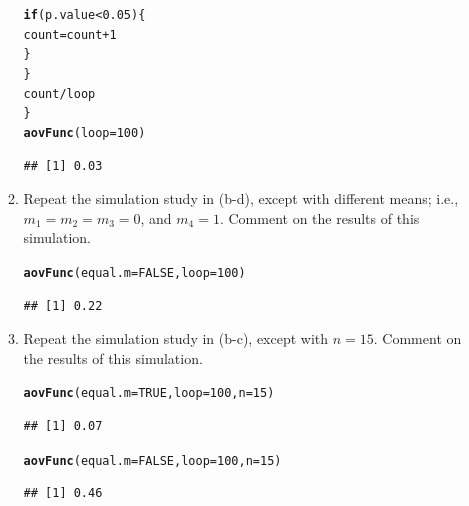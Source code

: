 \documentclass{article}\usepackage[]{graphicx}\usepackage[]{color}
\makeatletter
\newcommand{\hlnum}[1]{\textcolor[rgb]{0.686,0.059,0.569}{#1}}%
\newcommand{\hlopt}[1]{\textcolor[rgb]{0,0,0}{#1}}%
\newcommand{\hlstd}[1]{\textcolor[rgb]{0.345,0.345,0.345}{#1}}%
\newcommand{\hlkwa}[1]{\textcolor[rgb]{0.161,0.373,0.58}{\textbf{#1}}}%
\newcommand{\hlkwb}[1]{\textcolor[rgb]{0.69,0.353,0.396}{#1}}%
\newcommand{\hlkwc}[1]{\textcolor[rgb]{0.333,0.667,0.333}{#1}}%
\newcommand{\hlkwd}[1]{\textcolor[rgb]{0.737,0.353,0.396}{\textbf{#1}}}%
\newenvironment{kframe}{%
 \def\at@end@of@kframe{}%
 \ifinner\ifhmode%
  \def\at@end@of@kframe{\end{minipage}}%
  \begin{minipage}{\columnwidth}%
 \fi\fi%
 \def\FrameCommand##1{\hskip\@totalleftmargin \hskip-\fboxsep
 \colorbox{shadecolor}{##1}\hskip-\fboxsep
     \hskip-\linewidth \hskip-\@totalleftmargin \hskip\columnwidth}%
 \MakeFramed {\advance\hsize-\width
   \@totalleftmargin\z@ \linewidth\hsize
   \@setminipage}}%
 {\par\unskip\endMakeFramed%
 \at@end@of@kframe}
\newenvironment{knitrout}{}{} %
\makeatother
\begin{document}
\begin{enumerate}
\begin{enumerate}
\begin{knitrout}
\begin{kframe}
\begin{alltt}
    \hlkwa{if}\hlstd{(p.value}\hlopt{<}\hlnum{0.05}\hlstd{)\{}
     \hlstd{count}\hlkwb{=}\hlstd{count}\hlopt{+}\hlnum{1}
    \hlstd{\}}
  \hlstd{\}}
  \hlstd{count}\hlopt{/}\hlstd{loop}
\hlstd{\}}
\hlkwd{aovFunc}\hlstd{(}\hlkwc{loop}\hlstd{=}\hlnum{100}\hlstd{)}
\end{alltt}
\begin{verbatim}
## [1] 0.03
\end{verbatim}
\end{kframe}
\end{knitrout}

  \item Repeat the simulation study in (b-d), except with different means; i.e.,
  $m_1=m_2=m_3=0$, and $m_4=1$. Comment on the results of this simulation.

\begin{knitrout}
\color{fgcolor}\begin{kframe}
\begin{alltt}
\hlkwd{aovFunc}\hlstd{(}\hlkwc{equal.m}\hlstd{=}\hlnum{FALSE}\hlstd{,} \hlkwc{loop}\hlstd{=}\hlnum{100}\hlstd{)}
\end{alltt}
\begin{verbatim}
## [1] 0.22
\end{verbatim}
\end{kframe}
\end{knitrout}
\item Repeat the simulation study in (b-c), except with $n=15$. Comment on the results of this simulation.
\begin{knitrout}
\color{fgcolor}\begin{kframe}
\begin{alltt}
\hlkwd{aovFunc}\hlstd{(}\hlkwc{equal.m}\hlstd{=}\hlnum{TRUE}\hlstd{,} \hlkwc{loop}\hlstd{=}\hlnum{100}\hlstd{,} \hlkwc{n}\hlstd{=}\hlnum{15}\hlstd{)}
\end{alltt}
\begin{verbatim}
## [1] 0.07
\end{verbatim}
\begin{alltt}
\hlkwd{aovFunc}\hlstd{(}\hlkwc{equal.m}\hlstd{=}\hlnum{FALSE}\hlstd{,} \hlkwc{loop}\hlstd{=}\hlnum{100}\hlstd{,} \hlkwc{n}\hlstd{=}\hlnum{15}\hlstd{)}
\end{alltt}
\begin{verbatim}
## [1] 0.46
\end{verbatim}
\end{kframe}
\end{knitrout}

\end{enumerate}
\end{enumerate}
\end{document}
